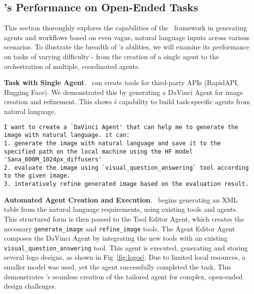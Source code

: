\subsection{\model's Performance on Open-Ended Tasks}
This section thoroughly explores the capabilities of the \model\ framework in generating agents and workflows based on even vague, natural language inputs across various scenarios. To illustrate the breadth of \model's abilities, we will examine its performance on tasks of varying difficulty - from the creation of a single agent to the orchestration of multiple, coordinated agents.

\noindent \textbf{Task with Single Agent}. \model\ can create tools for third-party APIs (RapidAPI, Hugging Face). We demonstrated this by generating a DaVinci Agent for image creation and refinement. This shows \model\'s capability to build task-specific agents from natural language.

\begin{lstlisting}[basicstyle=\ttfamily\footnotesize, frame=none, columns=fullflexible, breaklines=true, breakatwhitespace=true, breakindent=3pt]
I want to create a `DaVinci Agent' that can help me to generate the image with natural language. it can: 
1. generate the image with natural language and save it to the specified path on the local machine using the HF model 'Sana_600M_1024px_diffusers'
2. evaluate the image using `visual_question_answering` tool according to the given image.
3. interatively refine generated image based on the evaluation result.
\end{lstlisting}

\noindent \textbf{Automated Agent Creation and Execution}. \model\ begins generating an XML table from the natural language requirements, using existing tools and agents. This structured form is then passed to the Tool Editor Agent, which creates the necessary \texttt{generate\_image} and \texttt{refine\_image} tools. The Agent Editor Agent composes the DaVinci Agent by integrating the new tools with an existing \texttt{visual\_question\_answering} tool. This agent is executed, generating and storing several logo designs, as shown in Fig~\ref{fig:logos}. Due to limited local resources, a smaller model was used, yet the agent successfully completed the task. This demonstrates \model's seamless creation of the tailored agent for complex, open-ended design challenges.

